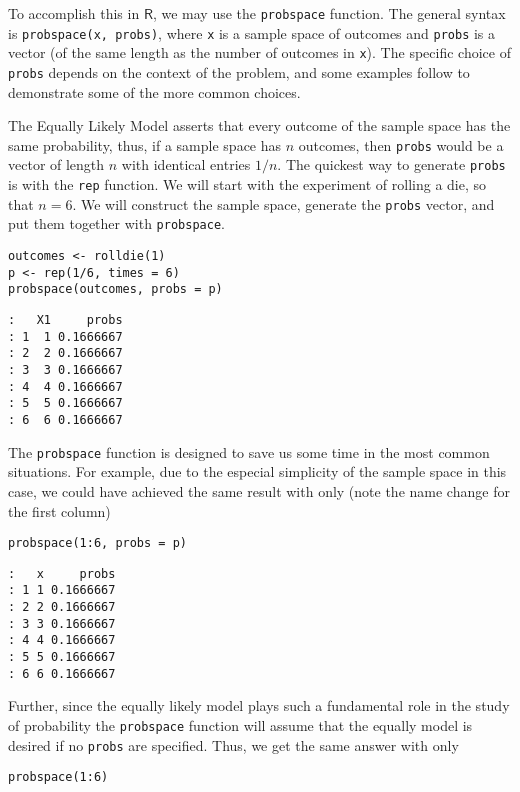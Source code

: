 To accomplish this in \(\mathsf{R}\), we may use the \texttt{probspace}
function. The general syntax is \texttt{probspace(x, probs)}, where \texttt{x} is a
sample space of outcomes and \texttt{probs} is a vector (of the same length
as the number of outcomes in \texttt{x}). The specific choice of \texttt{probs}
depends on the context of the problem, and some examples follow to
demonstrate some of the more common choices.


The Equally Likely Model asserts that every outcome of the sample
space has the same probability, thus, if a sample space has \(n\)
outcomes, then \texttt{probs} would be a vector of length \(n\) with
identical entries \(1/n\). The quickest way to generate \texttt{probs} is
with the \texttt{rep} function. We will start with the experiment of rolling
a die, so that \(n=6\). We will construct the sample space, generate
the \texttt{probs} vector, and put them together with \texttt{probspace}.

\begin{verbatim}
outcomes <- rolldie(1) 
p <- rep(1/6, times = 6) 
probspace(outcomes, probs = p) 
\end{verbatim}

\begin{verbatim}
:   X1     probs
: 1  1 0.1666667
: 2  2 0.1666667
: 3  3 0.1666667
: 4  4 0.1666667
: 5  5 0.1666667
: 6  6 0.1666667
\end{verbatim}

The \texttt{probspace} function is designed to save us some time in the most
common situations. For example, due to the especial simplicity of the
sample space in this case, we could have achieved the same result with
only (note the name change for the first column)

\begin{verbatim}
probspace(1:6, probs = p) 
\end{verbatim}

\begin{verbatim}
:   x     probs
: 1 1 0.1666667
: 2 2 0.1666667
: 3 3 0.1666667
: 4 4 0.1666667
: 5 5 0.1666667
: 6 6 0.1666667
\end{verbatim}

Further, since the equally likely model plays such a fundamental role
in the study of probability the \texttt{probspace} function will assume that
the equally model is desired if no \texttt{probs} are specified. Thus, we get
the same answer with only

\begin{verbatim}
probspace(1:6) 
\end{verbatim}

